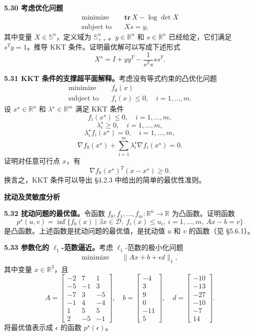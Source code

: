 \documentclass[UTF8, 12pt, fontset=fandol, oneside]{ctexart}
\begin{document}
\noindent\textbf{5.30 考虑优化问题}
\[
\begin{aligned}
\text{minimize}\quad & \mathbf{tr}\,X-\log\det X\\
\text{subject to}\quad & Xs=y,
\end{aligned}
\]
其中变量 $X\in\mathbb{S}^n$，定义域为 $\mathbb{S}_{++}^n$。$y\in\mathbb{R}^n$ 和 $s\in\mathbb{R}^n$ 已经给定，它们满足 $s^Ty=1$。推导 KKT 条件。证明最优解可以写成下述形式
\[
X^\star=I+yy^T-\frac{1}{s^Ts}ss^T.
\]

\noindent\textbf{5.31 KKT 条件的支撑超平面解释。}\quad 考虑没有等式约束的凸优化问题
\[
\begin{aligned}
\text{minimize}\quad & f_0(x)\\
\text{subject to}\quad & f_i(x)\leq 0,\quad i=1,\ldots,m.
\end{aligned}
\]
设 $x^\star\in\mathbb{R}^n$ 和 $\lambda^\star\in\mathbb{R}^m$ 满足 KKT 条件
\[
f_i(x^\star)\leq 0,\quad i=1,\ldots,m,
\]
\[
\lambda_i^\star\geq 0,\quad i=1,\ldots,m,
\]
\[
\lambda_i^\star f_i(x^\star)=0,\quad i=1,\ldots,m,
\]
\[
\nabla f_0(x^\star)+\sum_{i=1}^m\lambda_i^\star\nabla f_i(x^\star)=0.
\]
证明对任意可行点 $x$，有
\[
\nabla f_0(x^\star)^T(x-x^\star)\geq 0.
\]
换言之，KKT 条件可以导出 §4.2.3 中给出的简单的最优性准则。

\noindent\textbf{扰动及灵敏度分析}

\noindent\textbf{5.32 扰动问题的最优值。}\quad 令函数 $f_0,f_1,\ldots,f_m:\mathbb{R}^n\to\mathbb{R}$ 为凸函数。证明函数
\[
p^\star(u,v)=\inf\{f_0(x)\mid \exists x\in\mathcal{D},\ f_i(x)\leq u_i,\ i=1,\ldots,m,\ Ax-b=v\}
\]
是凸函数。上述函数是扰动问题的最优值，是扰动值 $u$ 和 $v$ 的函数（见 §5.6.1）。

\noindent\textbf{5.33 参数化的 $\ell_1$-范数逼近。}\quad 考虑 $\ell_1$-范数的极小化问题
\[
\begin{aligned}
\text{minimize}\quad & \|Ax+b+\epsilon d\|_1,
\end{aligned}
\]
其中变量 $x\in\mathbb{R}^3$，且
\[
A=
\begin{bmatrix}
-2 & 7 & 1\\
-5 & -1 & 3\\
-7 & 3 & -5\\
-1 & 4 & -4\\
1 & 5 & 5\\
2 & -5 & -1
\end{bmatrix},\quad
b=
\begin{bmatrix}
-4\\
3\\
9\\
0\\
-11\\
5
\end{bmatrix},\quad
d=
\begin{bmatrix}
-10\\
-13\\
-27\\
-10\\
-7\\
14
\end{bmatrix}.
\]
将最优值表示成 $\epsilon$ 的函数 $p^\star(\epsilon)$。
\end{document}
